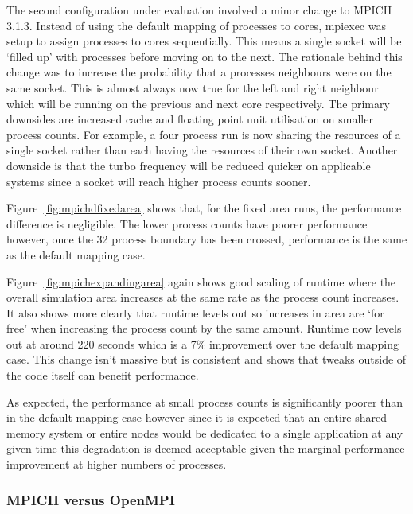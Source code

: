 The second configuration under evaluation involved a minor change to MPICH
3.1.3. Instead of using the default mapping of processes to cores, mpiexec was
setup to assign processes to cores sequentially. This means a single socket will
be `filled up' with processes before moving on to the next. The rationale behind
this change was to increase the probability that a processes neighbours were on
the same socket. This is almost always now true for the left and right neighbour
which will be running on the previous and next core respectively. The primary
downsides are increased cache and floating point unit utilisation on smaller
process counts. For example, a four process run is now sharing the resources of
a single socket rather than each having the resources of their own socket.
Another downside is that the turbo frequency will be reduced quicker on
applicable systems since a socket will reach higher process counts sooner.

Figure~\ref{fig:mpichdfixedarea} shows that, for the fixed area runs, the
performance difference is negligible. The lower process counts have poorer
performance however, once the 32 process boundary has been crossed, performance
is the same as the default mapping case.

Figure~\ref{fig:mpichexpandingarea} again shows good scaling of
runtime where the overall simulation area increases at the same rate as the
process count increases. It also shows more clearly that runtime levels out so
increases in area are `for free' when increasing the process count by the same
amount. Runtime now levels out at around 220 seconds which is a 7\% improvement
over the default mapping case. This change isn't massive but is consistent and
shows that tweaks outside of the code itself can benefit performance.

As expected, the performance at small process counts is significantly poorer
than in the default mapping case however since it is expected that an entire
shared-memory system or entire nodes would be dedicated to a single application
at any given time this degradation is deemed acceptable given the marginal
performance improvement at higher numbers of processes.

\subsubsection{MPICH versus OpenMPI}

